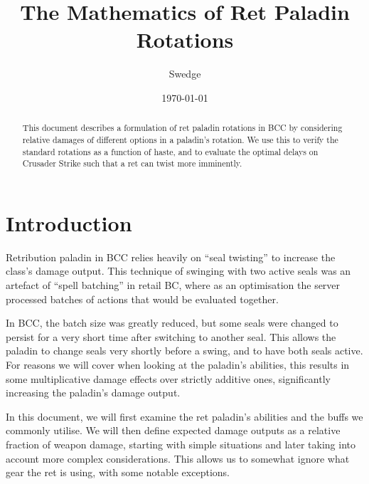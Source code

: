 \documentclass[letterpaper,11pt]{article}
\begin{document}
	
	\title{The Mathematics of Ret Paladin Rotations}
	\author{Swedge}
	\date{\today}
	\maketitle
	
	\begin{abstract}
		This document describes a formulation of ret paladin rotations in BCC by considering relative damages of different options in a paladin's rotation.
		We use this to verify the standard rotations as a function of haste, and to evaluate the optimal delays on Crusader Strike such that a ret can twist more imminently.
	\end{abstract}
	
	\section{Introduction}
	
	Retribution paladin in BCC relies heavily on ``seal twisting'' to increase the class's damage output.
	This technique of swinging with two active seals was an artefact of ``spell batching'' in retail BC, where as an optimisation the server processed batches of actions that would be evaluated together.
	
	In BCC, the batch size was greatly reduced, but some seals were changed to persist for a very short time after switching to another seal.
	This allows the paladin to change seals very shortly before a swing, and to have both seals active. For reasons we will cover when looking at the paladin's abilities, this results in some multiplicative damage effects over strictly additive ones, significantly increasing the paladin's damage output.
	
	In this document, we will first examine the ret paladin's abilities and the buffs we commonly utilise.
	We will then define expected damage outputs as a relative fraction of weapon damage, starting with simple situations and later taking into account more complex considerations.
	This allows us to somewhat ignore what gear the ret is using, with some notable exceptions.
	
\end{document}
